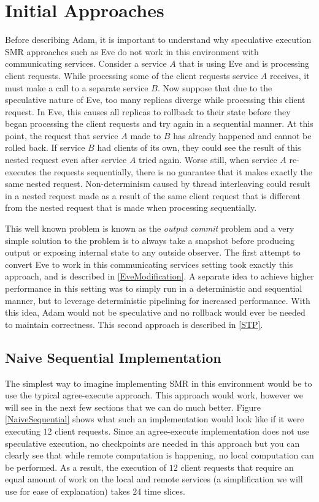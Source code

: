 \documentclass[11pt, oneside]{report}
\begin{document}
\section{Initial Approaches}

Before describing Adam, it is important to understand why speculative execution SMR approaches such as Eve do not work in this environment with communicating services. 
Consider a service $A$ that is using Eve and is processing client requests. 
While processing some of the client requests service $A$ receives, it must make a call to a separate service $B$. 
Now suppose that due to the speculative nature of Eve, too many replicas diverge while processing this client request. In Eve, this causes all replicas to rollback to their state before they began processing the client requests and try again in a sequential manner. 
At this point, the request that service $A$ made to $B$ has already happened and cannot be rolled back. 
If service $B$ had clients of its own, they could see the result of this nested request even after service $A$ tried again. 
Worse still, when service $A$ re-executes the requests sequentially, there is no guarantee that it makes exactly the same nested request. 
Non-determinism caused by thread interleaving could result in a nested request made as a result of the same client request that is different from the nested request that is made when processing sequentially.

This well known problem is known as the \textit{output commit} problem \cite{mootaz} and a very simple solution to the problem is to always take a snapshot before producing output or exposing internal state to any outside observer. 
The first attempt to convert Eve to work in this communicating services setting took exactly this approach, and is described in \ref{EveModification}. 
A separate idea to achieve higher performance in this setting was to simply run in a deterministic and sequential manner, but to leverage deterministic pipelining for increased performance. 
With this idea, Adam would not be speculative and no rollback would ever be needed to maintain correctness. This second approach is described in \ref{STP}.

\subsection{Naive Sequential Implementation}

The simplest way to imagine implementing SMR in this environment would be to use the typical agree-execute approach.
This approach would work, however we will see in the next few sections that we can do much better. 
Figure \ref{NaiveSequential} shows what such an implementation would look like if it were executing $12$ client requests. 
Since an agree-execute implementation does not use speculative execution, no checkpoints are needed in this approach but you can clearly see that while remote computation is happening, no local computation can be performed.
As a result, the execution of $12$ client requests that require an equal amount of work on the local and remote services (a simplification we will use for ease of explanation) takes $24$ time slices.
\end{document}
